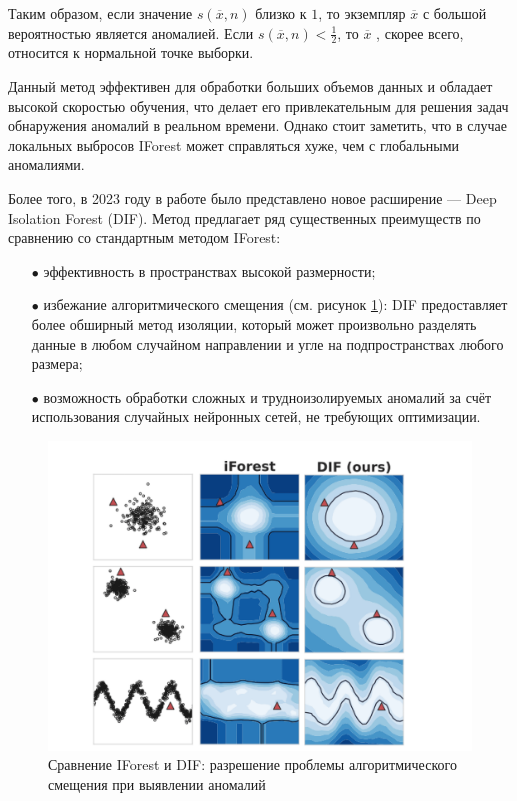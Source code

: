 Таким образом, если значение $s(\overline{x}, n)$ близко к $1$, то экземпляр $\overline{x}$ с большой вероятностью является аномалией. Если $s(\overline{x}, n) < \tfrac{1}{2}$, то $\overline{x}$ , скорее всего, относится к нормальной точке выборки.

Данный метод эффективен для обработки больших объемов данных и обладает высокой скоростью обучения, что делает его привлекательным для решения задач обнаружения аномалий в реальном времени. Однако стоит заметить, что в случае локальных выбросов IForest может справляться хуже, чем с глобальными аномалиями.

Более того, в 2023 году в работе \cite{DIF} было представлено новое расширение --- Deep Isolation Forest (DIF). Метод предлагает ряд существенных преимуществ по сравнению со стандартным методом IForest:

\begin{itemize}[leftmargin=0pt,itemindent=4.6em]
    \item[$\bullet$] эффективность в пространствах высокой размерности;
    \item[$\bullet$] избежание алгоритмического смещения (см. рисунок \ref{fig:iforest-and-dif-comparison}): DIF предоставляет более обширный метод изоляции, который может произвольно разделять данные в любом случайном направлении и угле на подпространствах любого размера;
    \item[$\bullet$] возможность обработки сложных и трудноизолируемых аномалий за счёт использования случайных нейронных сетей, не требующих оптимизации.
\end{itemize}

\begin{figure}
  \centering
  \includegraphics[scale=0.235]{inc/images/iforest-and-dif-comparison.png}
  \caption{Сравнение IForest и DIF: разрешение проблемы алгоритмического смещения при выявлении аномалий \cite{DIF}}
  \label{fig:iforest-and-dif-comparison}
\end{figure}

